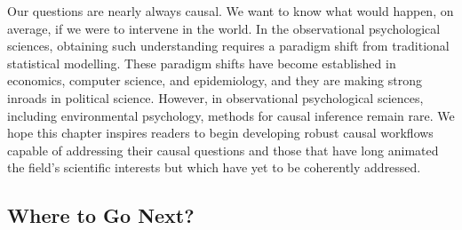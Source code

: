 \documentclass[
  singlecolumn]{article}
\begin{document}
Our questions are nearly always causal. We want to know what would
happen, on average, if we were to intervene in the world. In the
observational psychological sciences, obtaining such understanding
requires a paradigm shift from traditional statistical modelling. These
paradigm shifts have become established in economics, computer science,
and epidemiology, and they are making strong inroads in political
science. However, in observational psychological sciences, including
environmental psychology, methods for causal inference remain rare. We
hope this chapter inspires readers to begin developing robust causal
workflows capable of addressing their causal questions and those that
have long animated the field's scientific interests but which have yet
to be coherently addressed.

\subsection{Where to Go Next?}\label{where-to-go-next}
\end{document}
